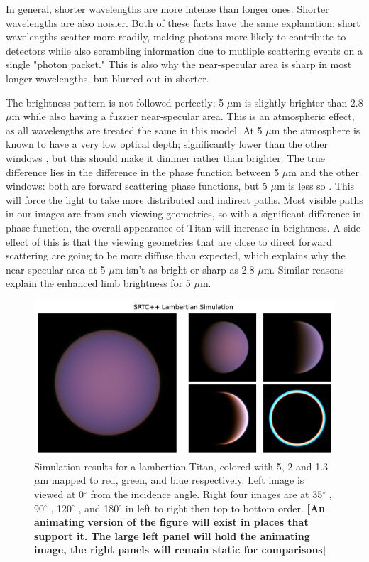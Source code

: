 \documentclass[twocolumn,linenumbers]{aastex631}
\begin{document}
In general, shorter wavelengths are more intense than longer ones. Shorter wavelengths are also noisier. Both of these facts have the same explanation: short wavelengths scatter more readily, making photons more likely to contribute to detectors while also scrambling information due to mutliple scattering events on a single "photon packet." This is also why the near-specular area is sharp in most longer wavelengths, but blurred out in shorter.

The brightness pattern is not followed perfectly: 5 $\mu$m is slightly brighter than 2.8 $\mu$m while also having a fuzzier near-specular area. This is an atmospheric effect, as all wavelengths are treated the same in this model. At 5 $\mu$m the atmosphere is known to have a very low optical depth; significantly lower than the other windows \citep{EsSayeh2023}, but this should make it dimmer rather than brighter. The true difference lies in the difference in the phase function between 5 $\mu$m and the other windows: both are forward scattering phase functions, but 5 $\mu$m is less so \citep{Tomasko2008}. This will force the light to take more distributed and indirect paths. Most visible paths in our images are from such viewing geometries, so with a significant difference in phase function, the overall appearance of Titan will increase in brightness. A side effect of this is that the viewing geometries that are close to direct forward scattering are going to be more diffuse than expected, which explains why the near-specular area at 5 $\mu$m isn't as bright or sharp as 2.8 $\mu$m. Similar reasons explain the enhanced limb brightness for 5 $\mu$m.

\begin{figure}[htbp]
\includegraphics[scale = 0.4]{LambertianSim.pdf}
\centering
\caption{Simulation results for a lambertian Titan, colored with 5, 2 and 1.3 $\mu$m mapped to red, green, and blue respectively. Left image is viewed at 0$^{\circ}$  from the incidence angle. Right four images are at  35$^{\circ}$ ,  90$^{\circ}$ ,  120$^{\circ}$ , and  180$^{\circ}$  in left to right then top to bottom order. \textbf{\color{red}[An animating version of the figure will exist in places that support it. The large left panel will hold the animating image, the right panels will remain static for comparisons] \color{black}}}
\label{fig:9}
\end{figure}
\end{document}
